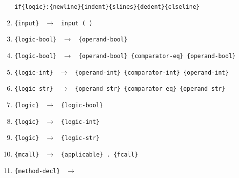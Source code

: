 \documentclass[a4paper,10pt,notitlepage,pdftex]{scrreprt}
\begin{document}
\begin{enumerate}
                    \verb'if{logic}:{newline}{indent}{slines}{dedent}{elseline}'
                \item \verb'{input} ' $\rightarrow$ \verb' input ( )'
                \item \verb'{logic-bool} ' $\rightarrow$ \verb' {operand-bool}'
                \item \verb'{logic-bool} ' $\rightarrow$ \verb' {operand-bool} {comparator-eq} {operand-bool}'
                \item \verb'{logic-int} ' $\rightarrow$ \verb' {operand-int} {comparator-int} {operand-int}'
                \item \verb'{logic-str} ' $\rightarrow$ \verb' {operand-str} {comparator-eq} {operand-str}'
                \item \verb'{logic} ' $\rightarrow$ \verb' {logic-bool}'
                \item \verb'{logic} ' $\rightarrow$ \verb' {logic-int}'
                \item \verb'{logic} ' $\rightarrow$ \verb' {logic-str}'
                \item \verb'{mcall} ' $\rightarrow$ \verb' {applicable} . {fcall}'
                \item \verb'{method-decl} ' $\rightarrow$


\end{enumerate}
\end{document}
